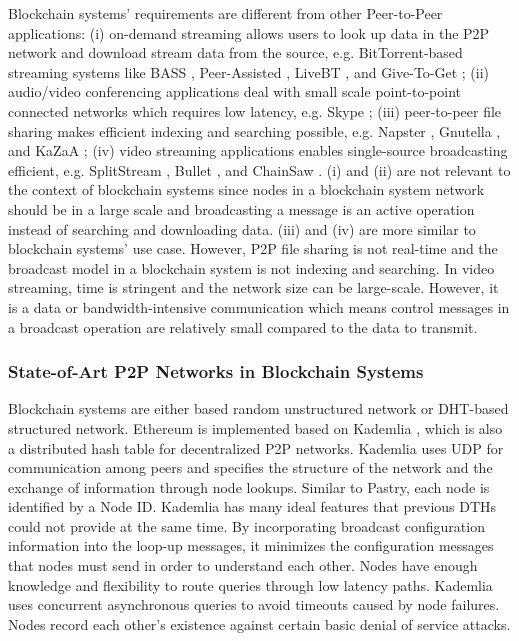 Blockchain systems' requirements are different from other Peer-to-Peer applications: (i) on-demand streaming allows users to look up data in the P2P network and download stream data from the source, e.g. BitTorrent-based streaming systems like BASS \cite{dana2005bass}, Peer-Assisted \cite{carlsson2007peer}, LiveBT \cite{lv2007livebt}, and Give-To-Get \cite{mol2008give}; (ii) audio/video conferencing applications deal with small scale point-to-point connected networks which requires low latency, e.g. Skype \cite{baset2004analysis}; (iii) peer-to-peer file sharing makes efficient indexing and searching possible, e.g. Napster \cite{saroiu2003measuring}, Gnutella \cite{ripeanu2001peer}, and KaZaA \cite{good2003usability}; (iv) video streaming applications enables single-source broadcasting efficient, e.g. SplitStream \cite{castro2003splitstream}, Bullet \cite{kostic2003bullet}, and ChainSaw \cite{pai2005chainsaw}. (i) and (ii) are not relevant to the context of blockchain systems since nodes in a blockchain system network should be in a large scale and broadcasting a message is an active operation instead of searching and downloading data. (iii) and (iv) are more similar to blockchain systems' use case. However, P2P file sharing is not real-time and the broadcast model in a blockchain system is not indexing and searching. In video streaming, time is stringent and the network size can be large-scale. However, it is a data or bandwidth-intensive communication which means control messages in a broadcast operation are relatively small compared to the data to transmit.

\subsubsection{State-of-Art P2P Networks in Blockchain Systems}

Blockchain systems are either based random unstructured network or DHT-based structured network. Ethereum is implemented based on Kademlia \cite{maymounkov2002kademlia}, which is also a distributed hash table for decentralized P2P networks. Kademlia uses UDP for communication among peers and specifies the structure of the network and the exchange of information through node lookups. Similar to Pastry, each node is identified by a Node ID. Kademlia has many ideal features that previous DTHs could not provide at the same time. By incorporating broadcast configuration information into the loop-up messages, it minimizes the configuration messages that nodes must send in order to understand each other. Nodes have enough knowledge and flexibility to route queries through low latency paths. Kademlia uses concurrent asynchronous queries to avoid timeouts caused by node failures. Nodes record each other's existence against certain basic denial of service attacks.

